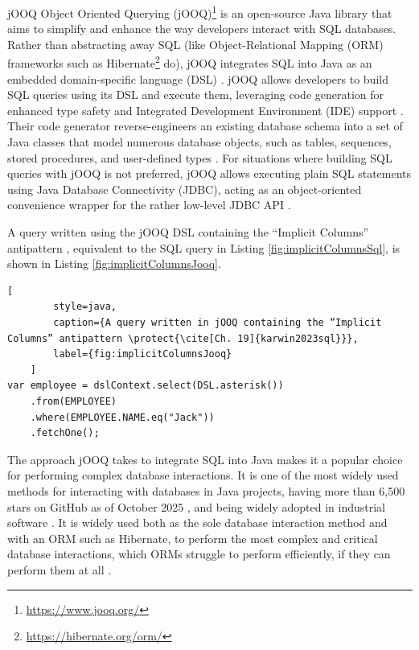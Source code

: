 \documentclass{article}
\begin{document}
jOOQ Object Oriented Querying (jOOQ)\footnote{\hyperlink{https://www.jooq.org/}{https://www.jooq.org/}} is an open-source Java library that aims to simplify and enhance the way developers interact with SQL databases. Rather than abstracting away SQL (like Object-Relational Mapping (ORM) frameworks such as Hibernate\footnote{\hyperlink{https://hibernate.org/orm/}{https://hibernate.org/orm/}} do), jOOQ integrates SQL into Java as an embedded domain-specific language (DSL) \cite{jooq2025sql}. jOOQ allows developers to build SQL queries using its DSL and execute them, leveraging code generation for enhanced type safety and Integrated Development Environment (IDE) support \cite{jooq2025codegen}. Their code generator reverse-engineers an existing database schema into a set of Java classes that model numerous database objects, such as tables, sequences, stored procedures, and user-defined types \cite{jooq2025codegen}. For situations where building SQL queries with jOOQ is not preferred, jOOQ allows executing plain SQL statements using Java Database Connectivity (JDBC), acting as an object-oriented convenience wrapper for the rather low-level JDBC API \cite{jooq2025execution}.

A query written using the jOOQ DSL containing the “Implicit Columns” antipattern \cite[Ch. 19]{karwin2023sql}, equivalent to the SQL query in Listing \ref{fig:implicitColumnsSql}, is shown in Listing \ref{fig:implicitColumnsJooq}.

\noindent\begin{minipage}{\textwidth}
    \begin{lstlisting}[
        style=java, 
        caption={A query written in jOOQ containing the “Implicit Columns” antipattern \protect{\cite[Ch. 19]{karwin2023sql}}}, 
        label={fig:implicitColumnsJooq}
    ]
var employee = dslContext.select(DSL.asterisk())
    .from(EMPLOYEE)
    .where(EMPLOYEE.NAME.eq("Jack"))
    .fetchOne();
    \end{lstlisting}
\end{minipage}

The approach jOOQ takes to integrate SQL into Java makes it a popular choice for performing complex database interactions. It is one of the most widely used methods for interacting with databases in Java projects, having more than 6,500 stars on GitHub as of October 2025 \cite{jooq2025repo}, and being widely adopted in industrial software \cite{jooq2025customers}. It is widely used both as the sole database interaction method and with an ORM such as Hibernate, to perform the most complex and critical database interactions, which ORMs struggle to perform efficiently, if they can perform them at all \cite[p. 423]{mihalcea2016high}.
\end{document}

